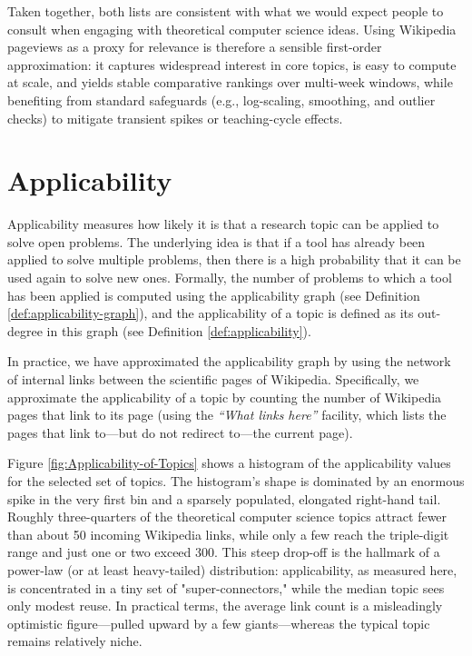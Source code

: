 Taken together, both lists are consistent with what we would expect people to consult when engaging with theoretical computer science ideas. Using Wikipedia pageviews as a proxy for relevance is therefore a sensible first-order approximation: it captures widespread interest in core topics, is easy to compute at scale, and yields stable comparative rankings over multi-week windows, while benefiting from standard safeguards (e.g., log-scaling, smoothing, and outlier checks) to mitigate transient spikes or teaching-cycle effects.

%
%
\section{Applicability}

Applicability measures how likely it is that a research topic can be applied to solve open problems. The underlying idea is that if a tool has already been applied to solve multiple problems, then there is a high probability that it can be used again to solve new ones. Formally, the number of problems to which a tool has been applied is computed using the applicability graph (see Definition \ref{def:applicability-graph}), and the applicability of a topic is defined as its out-degree in this graph (see Definition \ref{def:applicability}). 

In practice, we have approximated the applicability graph by using the network of internal links between the scientific pages of Wikipedia. Specifically, we approximate the applicability of a topic by counting the number of Wikipedia pages that link to its page (using the \emph{``What links here''} facility, which lists the pages that link to—but do not redirect to—the current page).

Figure \ref{fig:Applicability-of-Topics} shows a histogram of the applicability values for the selected set of topics. The histogram's shape is dominated by an enormous spike in the very first bin and a sparsely populated, elongated right-hand tail. Roughly three-quarters of the theoretical computer science topics attract fewer than about 50 incoming Wikipedia links, while only a few reach the triple-digit range and just one or two exceed 300. This steep drop-off is the hallmark of a power-law (or at least heavy-tailed) distribution: applicability, as measured here, is concentrated in a tiny set of "super-connectors," while the median topic sees only modest reuse. In practical terms, the average link count is a misleadingly optimistic figure—pulled upward by a few giants—whereas the typical topic remains relatively niche.

